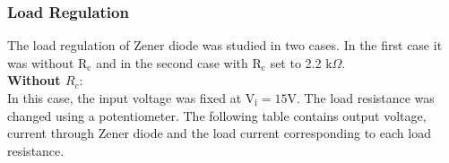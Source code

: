 \documentclass[12pt]{article}
\begin{document}
\begin{figure}[H]
    \centering
    
\end{figure}


\subsubsection{Load Regulation}
The load regulation of Zener diode was studied in two cases. In the first case it was without $\mathrm{R_c}$ and in the second case with $\mathrm{R_c}$ set to 2.2 $\text{k}\Omega$.\\[0.3cm]
\textbf{Without $R_c:$ }\\[0.3cm]
In this case, the input voltage was fixed at \( \mathrm{V_i} = 15 \mathrm{V}\). The load resistance was changed using a potentiometer. The following table contains output voltage, current through Zener diode and the load current corresponding to each load resistance.
\end{document}

